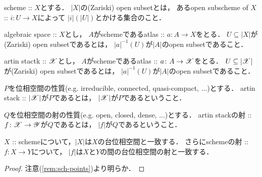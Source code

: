 \documentclass[a4paper, dvipdfmx]{jsarticle}
\begin{document}
\begin{Def}
\begin{myenum}
    \item
        scheme :: $X$とする．
        $|X|$の(Zariski) open subsetとは，
        あるopen subscheme of $X$ :: $i \colon U \to X$によって
        $|i|(|U|)$とかける集合のこと．

    \item
        algebraic space :: $X$とし，
        $A$がschemeであるatlas :: $a \colon A \to X$をとる．
        $U \subseteq |X|$が(Zariski) open subsetであるとは，
        $|a|^{-1}(U)$が$|A|$のopen subsetであること．

    \item
        artin stactk :: $\mathscr{X}$とし，
        $A$がschemeであるatlas :: $a \colon A \to \mathscr{X}$をとる．
        $U \subseteq |\mathscr{X}|$が(Zariski) open subsetであるとは，
        $|a|^{-1}(U)$が$|A|$のopen subsetであること．
\end{myenum}
\end{Def}

\begin{Def}
    $P$を位相空間の性質(e.g. irreducible, connected, quasi-compact, ...)とする．
    artin stack :: $|\mathscr{X}|$が$P$であるとは，
    $|\mathscr{X}|$が$P$であるということ．

    $Q$を位相空間の射の性質(e.g. open, closed, dense, ...)とする．
    artin stackの射 :: $f \colon \mathscr{X} \to \mathscr{Y}$が$Q$であるとは，
    $|f|$が$Q$であるということ．
\end{Def}

\begin{Lemma}
    $X$ :: schemeについて，$|X|$は$X$の台位相空間と一致する．
    さらにschemeの射 :: $f \colon X \to Y$について，
    $|f|$は$X$と$Y$の間の台位相空間の射と一致する．
\end{Lemma}
\begin{proof}
    注意(\ref{rem:sch-points})より明らか．
\end{proof}
\end{document}
